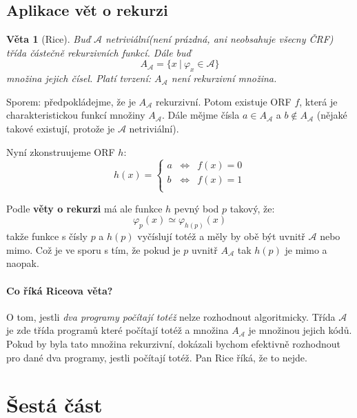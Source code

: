 \documentclass[a4paper]{article}      %
\newtheorem{theorem}{Věta}[section]
\newenvironment{proof}[1][Důkaz]{\begin{trivlist}
\item[\hskip \labelsep {\bfseries #1}]}{\end{trivlist}}
\begin{document}
\subsection{Aplikace vět o rekurzi}

\begin{theorem}[Rice]
Buď $\mathcal{A}$ \emph{netriviální}(není prázdná, ani neobsahuje všecny ČRF) třída částečně rekurzivních funkcí. Dále buď
\[
A_{\mathcal{A}}= \lbrace x\ |\ \varphi_{x} \in \mathcal{A}\rbrace
\]
množina jejich čísel. Platí tvrzení: $A_{\mathcal{A}}$ není rekurzivní množina. 
\end{theorem}

\begin{proof}
Sporem: předpokládejme, že je $A_{\mathcal{A}}$ rekurzivní.
Potom existuje ORF $f$, která je charakteristickou funkcí množiny $A_{\mathcal{A}}$.
Dále mějme čísla $a \in A_{\mathcal{A}}$ a $b \notin A_{\mathcal{A}}$ (nějaké takové existují, protože je $\mathcal{A}$ netriviální).

Nyní zkonstruujeme ORF $h$:
\[
h(x) = \left\{
\begin{array}{lcl}
a & \Leftrightarrow & f(x) = 0\\
b & \Leftrightarrow & f(x) = 1\\
\end{array}
\right.
\]

Podle \textbf{věty o rekurzi} má ale funkce $h$ pevný bod $p$ takový, že:
\[
\varphi_{p}(x) \simeq \varphi_{h(p)}(x)
\]
takže funkce s čísly $p$ a $h(p)$ vyčíslují totéž a měly by obě být uvnitř $\mathcal{A}$ nebo mimo. Což je ve sporu s tím, že
pokud je $p$ uvnitř $A_{\mathcal{A}}$ tak $h(p)$ je mimo a naopak.
\end{proof}

\paragraph{Co říká Riceova věta?} O tom, jestli \emph{dva programy počítají totéž} nelze rozhodnout algoritmicky.
Třída $\mathcal{A}$ je zde třída programů které počítají totéž a množina $A_{\mathcal{A}}$ je množinou jejich kódů.
Pokud by byla tato množina rekurzivní, dokázali bychom efektivně rozhodnout pro dané dva programy, jestli počítají totéž.
Pan Rice říká, že to nejde.  

\section{Šestá část}
\end{document}
